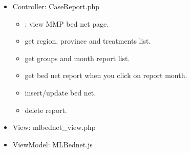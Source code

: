 \documentclass[letterpaper,10pt,english,openany,oneside]{sphinxmanual}
\begin{document}
\begin{itemize}
\item {} 
\sphinxAtStartPar
Controller: CaseReport.php
\begin{itemize}
\item {} 
\sphinxAtStartPar
{} : view MMP bed net page.

\item {} 
\sphinxAtStartPar
{} get region, province and treatments list.

\item {} 
\sphinxAtStartPar
{} get groups and month report list.

\item {} 
\sphinxAtStartPar
{} get bed net report when you click on report month.

\item {} 
\sphinxAtStartPar
{} insert/update bed net.

\end{itemize}

\begin{sphinxVerbatim}[commandchars=\\\{\}]
     
   
 
\end{sphinxVerbatim}
\begin{itemize}
\item {} 
\sphinxAtStartPar
{} delete report.

\end{itemize}

\item {} 
\sphinxAtStartPar
View: mlbednet\_view.php

\item {} 
\sphinxAtStartPar
ViewModel: MLBednet.js

\end{itemize}

\begin{sphinxVerbatim}[commandchars=\\\{\}]
  
  
    
    
  
  
     
     
\end{sphinxVerbatim}
\end{document}
